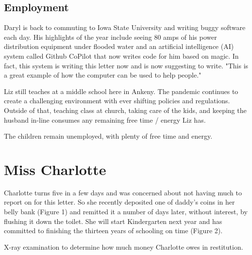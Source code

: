 \documentclass[letterpaper,11pt]{article}
\makeatletter
\newenvironment{figurehere}
  {\def\@captype{figure}}
  {}
\makeatother
\begin{document}
\begin{multicols}{2}
\bigskip

\subsection{Employment}

Daryl is back to commuting to Iowa State University and writing buggy
software each day.  His highlights of the year include seeing 80 amps of
his power distribution equipment under flooded water and an artificial
intelligence (AI) system called Github CoPilot that now writes code for him
based on magic.  In fact, this system is writing this letter now and is
now suggesting to write. "This is a great example of how the computer
can be used to help people."

Liz still teaches at a middle school here in Ankeny.  The pandemic continues
to create a challenging environment with ever shifting policies and regulations.
Outside of that, teaching class at church, taking care of the kids, and keeping
the husband in-line consumes any remaining free time / energy Liz has.

The children remain unemployed, with plenty of free time and energy.

\section{Miss Charlotte}

Charlotte turns five in a few days and was concerned about not having much to
report on for this letter. So she recently deposited one of daddy's coins in her
belly bank (Figure 1) and remitted it a number of days later, without interest, by flushing it
down the toilet.  She will start Kindergarten next year and has committed to
finishing the thirteen years of schooling on time (Figure 2).

\begin{figurehere}
    \centering   
    \caption{X-ray examination to determine how much money Charlotte owes in restitution.}
\end{figurehere}


\end{multicols}
\end{document}
